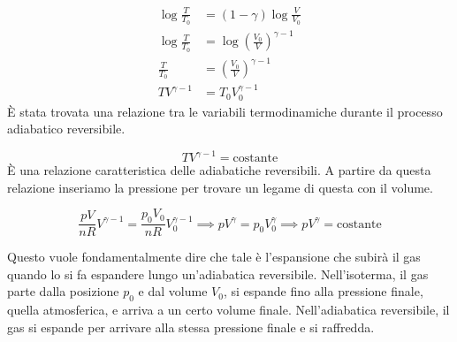 \begin{align*}
	\log \frac{T}{T_0} &= (1-\gamma) \log \frac{V}{V_0} \\
	\log \frac{T}{T_0} &= \log \left(\frac{V_0}{V}\right)^{\gamma-1} \\
	\frac{T}{T_0} &= \left( \frac{V_0}{V} \right)^{\gamma -1} \\
	TV^{\gamma -1} &= T_0 V_0^{\gamma -1}
\end{align*}
È stata trovata una relazione tra le variabili termodinamiche durante il processo adiabatico reversibile.

\[
	\boxed{TV^{\gamma -1} = \text{costante}}
\]
È una relazione caratteristica delle adiabatiche reversibili. A partire da questa relazione inseriamo la pressione per trovare un legame di questa con il volume.

\[
	\frac{pV}{nR}V^{\gamma -1} = \frac{p_0 V_0}{nR}V_0^{\gamma -1} \implies pV^{\gamma }=p_0 V_0^{\gamma } \implies \boxed{pV^{\gamma} = \text{costante}}
\]

Questo vuole fondamentalmente dire che tale è l'espansione che subirà il gas quando lo si fa espandere lungo un'adiabatica reversibile. Nell'isoterma, il gas parte dalla posizione $p_0$ e dal volume $V_0$, si espande fino alla pressione finale, quella atmosferica, e arriva a un certo volume finale. Nell'adiabatica reversibile, il gas si espande per arrivare alla stessa pressione finale e si raffredda. 

